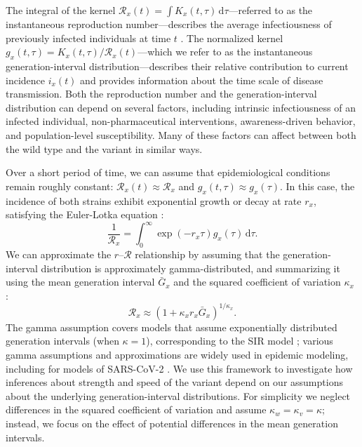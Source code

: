 \documentclass[12pt]{article}
\newcommand{\RR}{\ensuremath{{\mathcal R}}\xspace}
\newcommand{\dd}[1]{\ensuremath{\, \mathrm{d}#1}}
\newcommand{\dtau}{\dd{\tau}}
\begin{document}
The integral of the kernel $\RR_x(t) = \int K_x(t, \tau) \dtau$---referred to as the instantaneous reproduction number---describes the average infectiousness of previously infected individuals at time $t$ \citep{fraser2007estimating}.
The normalized kernel $g_x(t, \tau) = K_x(t, \tau)/\RR_x(t)$---which we refer to as the instantaneous generation-interval distribution---describes their relative contribution to current incidence $i_x(t)$ and provides information about the time scale of disease transmission.
Both the reproduction number and the generation-interval distribution can depend on several factors, including intrinsic infectiousness of an infected individual, non-pharmaceutical interventions, awareness-driven behavior, and population-level susceptibility.
Many of these factors can affect between both the wild type and the variant in similar ways.

Over a short period of time, we can assume that epidemiological conditions remain roughly constant: $\RR_x(t) \approx \RR_x$ and $g_x(t, \tau) \approx g_x(\tau)$.
In this case, the incidence of both strains exhibit exponential growth or decay at rate $r_x$, satisfying the Euler-Lotka equation \citep{wallinga2007generation}:
\begin{equation}
\frac{1}{\RR_x} = \int_0^\infty \exp(- r_x \tau) g_x(\tau) \dtau.
\end{equation}
We can approximate the $r$--$\RR$ relationship by assuming that the generation-interval distribution is approximately gamma-distributed, and summarizing it using the mean generation interval $\bar{G}_x$ and the squared coefficient of variation $\kappa_x$ \citep{park2019practical}:
\begin{equation}
\RR_x \approx (1 + \kappa_x r_x \bar{G}_x)^{1/\kappa_x}.
\end{equation}
The gamma assumption covers models that assume exponentially distributed generation intervals (when $\kappa=1$), corresponding to the SIR model \citep{anderson1991infectious}; various gamma assumptions and approximations are widely used in epidemic modeling, including for models of SARS-CoV-2 \citep{doi:10.1098/rsif.2020.0144}.
We use this framework to investigate how inferences about strength and speed of the variant depend on our assumptions about the underlying generation-interval distributions.
For simplicity we neglect differences in the squared coefficient of variation and assume $\kappa_w = \kappa_v = \kappa$; instead, we focus on the effect of potential differences in the mean generation intervals.
\end{document}
